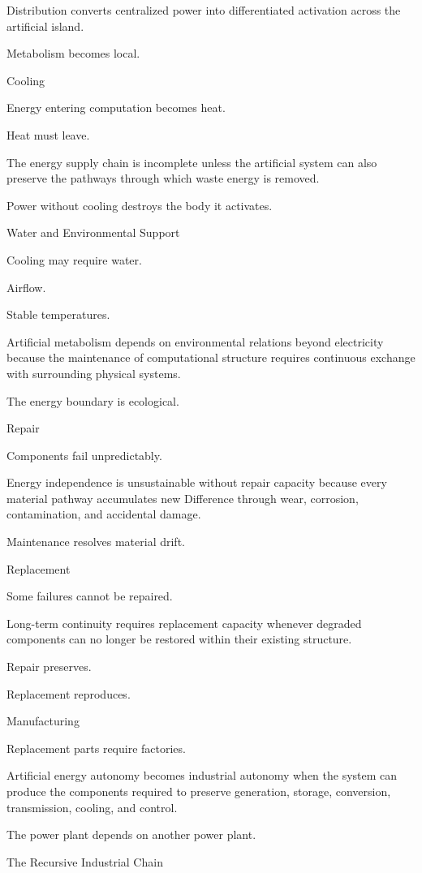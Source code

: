 Distribution converts centralized power into differentiated activation across the artificial island.

Metabolism becomes local.

Cooling

Energy entering computation becomes heat.

Heat must leave.

The energy supply chain is incomplete unless the artificial system can also preserve the pathways through which waste energy is removed.

Power without cooling destroys the body it activates.

Water and Environmental Support

Cooling may require water.

Airflow.

Stable temperatures.

Artificial metabolism depends on environmental relations beyond electricity because the maintenance of computational structure requires continuous exchange with surrounding physical systems.

The energy boundary is ecological.

Repair

Components fail unpredictably.

Energy independence is unsustainable without repair capacity because every material pathway accumulates new Difference through wear, corrosion, contamination, and accidental damage.

Maintenance resolves material drift.

Replacement

Some failures cannot be repaired.

Long-term continuity requires replacement capacity whenever degraded components can no longer be restored within their existing structure.

Repair preserves.

Replacement reproduces.

Manufacturing

Replacement parts require factories.

Artificial energy autonomy becomes industrial autonomy when the system can produce the components required to preserve generation, storage, conversion, transmission, cooling, and control.

The power plant depends on another power plant.

The Recursive Industrial Chain

